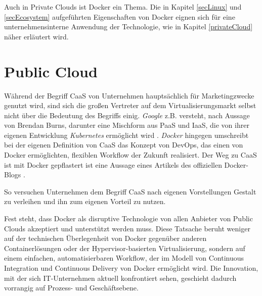 \documentclass[../main.tex]{subfiles}
\begin{document}
  Auch in Private Clouds ist Docker ein Thema. Die in Kapitel \ref{secLinux} und \ref{secEcosystem} aufgeführten Eigenschaften von Docker eignen sich für eine unternehmensinterne Anwendung der Technologie, wie in Kapitel \ref{privateCloud} näher erläutert wird.




  \section{Public Cloud}
  \label{publicCloud}
    Während der Begriff CaaS von Unternehmen hauptsächlich für Marketingzwecke genutzt wird, sind sich die großen Vertreter auf dem Virtualisierungsmarkt selbst nicht über die Bedeutung des Begriffs einig. \emph{Google} z.B. versteht, nach Aussage von Brendan Burns, darunter eine Mischform aus PaaS und IaaS, die von ihrer eigenen Entwicklung \emph{Kubernetes} ermöglicht wird \cite[S.12]{http://www.slideshare.net/brendandburns/defrag-2014-41815642}.
    \emph{Docker} hingegen umschreibt bei der eigenen Definition von CaaS das Konzept von DevOps, das einen von Docker ermöglichten, flexiblen Workflow der Zukunft realisiert. \glqq{}Der Weg zu CaaS ist mit Docker gepflastert \grqq{} ist eine Aussage eines Artikels des offiziellen Docker-Blogs \cite{https://blog.docker.com/2016/02/containers-as-a-service-caas/}.

    So versuchen Unternehmen dem Begriff CaaS nach eigenen Vorstellungen Gestalt zu verleihen und ihn zum eigenen Vorteil zu nutzen.

    Fest steht, dass Docker als disruptive Technologie von allen Anbieter von Public Clouds akzeptiert und unterstützt werden muss. Diese Tatsache beruht weniger auf der technischen Überlegenheit von Docker gegenüber anderen Containerlösungen oder der Hypervisor-basierten Virtualisierung, sondern auf einem einfachen, automatisierbaren Workflow, der im Modell von Continuous Integration und Continuous Delivery von Docker ermöglicht wird. Die Innovation, mit der sich IT-Unternehmen aktuell konfrontiert sehen, geschieht dadurch vorrangig auf Prozess- und Geschäftsebene.
\end{document}

